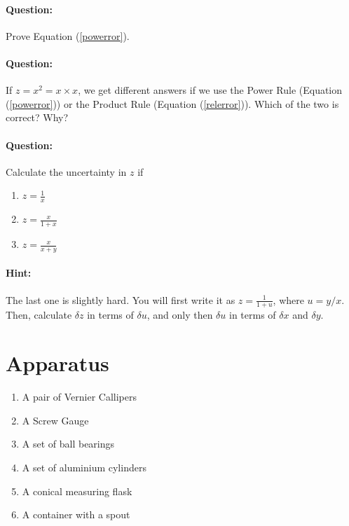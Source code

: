 \begin{question}
\paragraph{Question:} Prove Equation (\ref{powerror}).~\\

\paragraph{Question:} If $z = x^2 = x \times x$, we get different answers if we use the Power Rule (Equation (\ref{powerror})) or the Product Rule (Equation (\ref{relerror})). Which of the two is correct? Why? ~\\

\paragraph{Question:} Calculate the uncertainty in $z$ if
\begin{enumerate}
    \item $z = \frac{1}{x}$
    \item $z = \frac{x}{1+x}$
    \item $z = \frac{x}{x+y}$
\end{enumerate}
\paragraph{Hint:} The last one is slightly hard. You will first write it as $z = \frac{1}{1 + u}$, where $u = y/x$. Then, calculate $\delta z$ in terms of $\delta u$, and only then $\delta u$ in terms of $\delta x$ and $\delta y$.
\end{question}

\section{Apparatus}

\begin{enumerate}
    \item A pair of Vernier Callipers
    \item A Screw Gauge
    \item A set of ball bearings
    \item A set of aluminium cylinders
    \item A conical measuring flask
    \item A container with a spout
\end{enumerate}

